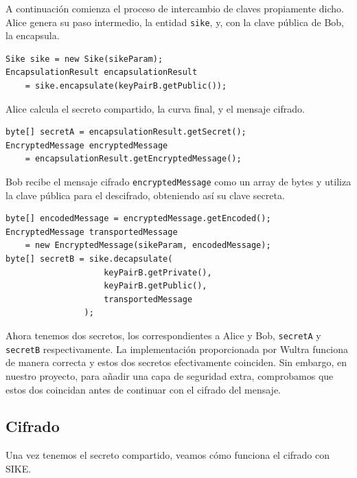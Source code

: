 A continuación comienza el proceso de intercambio de claves propiamente dicho. Alice genera su paso intermedio, la entidad \verb|sike|, y, con la clave pública de Bob, la encapsula.

\begin{verbatim}
Sike sike = new Sike(sikeParam);
EncapsulationResult encapsulationResult 
    = sike.encapsulate(keyPairB.getPublic());
\end{verbatim}

Alice calcula el secreto compartido, la curva final, y el mensaje cifrado.

\begin{verbatim}
byte[] secretA = encapsulationResult.getSecret();
EncryptedMessage encryptedMessage 
    = encapsulationResult.getEncryptedMessage();
\end{verbatim}

Bob recibe el mensaje cifrado \verb|encryptedMessage| como un array de bytes y utiliza la clave pública para el descifrado, obteniendo así su clave secreta. 

\begin{verbatim}
byte[] encodedMessage = encryptedMessage.getEncoded();
EncryptedMessage transportedMessage 
    = new EncryptedMessage(sikeParam, encodedMessage);
byte[] secretB = sike.decapsulate(
                    keyPairB.getPrivate(), 
                    keyPairB.getPublic(), 
                    transportedMessage
                );
\end{verbatim}

Ahora tenemos dos secretos, los correspondientes a Alice y Bob, \verb|secretA| y \verb|secretB| respectivamente. La implementación proporcionada por Wultra funciona de manera correcta y estos dos secretos efectivamente coinciden. Sin embargo, en nuestro proyecto, para añadir una capa de seguridad extra, comprobamos que estos dos coincidan antes de continuar con el cifrado del mensaje.

%
%

\subsection{Cifrado}

Una vez tenemos el secreto compartido, veamos cómo funciona el cifrado con SIKE.

